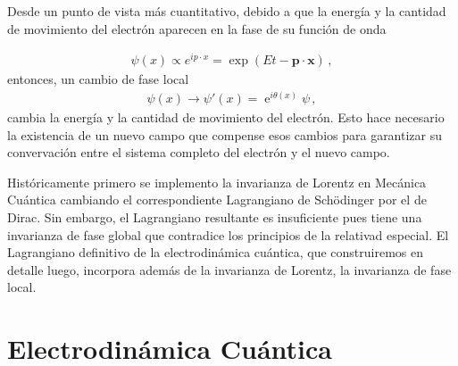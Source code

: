 Desde un punto de vista más cuantitativo, debido a que la energía y la cantidad de movimiento del electrón aparecen  en la fase de su función de onda
\begin{frame}
\begin{align}
  \psi(x)\propto e^{i p\cdot x}=\exp(Et-\mathbf{p}\cdot \mathbf{x})\,,
\end{align}
entonces, un cambio de fase local
\begin{align}
 \psi(x)\to \psi'(x)=\operatorname{e}^{{i\theta(x)}}\psi\,,
\end{align}
cambia la energía y la cantidad de movimiento del electrón. Esto hace necesario la existencia de un nuevo campo que compense esos cambios para garantizar su convervación entre el sistema completo del electrón y el nuevo campo.
\end{frame}

Históricamente primero se implemento la invarianza de Lorentz en Mecánica Cuántica cambiando el correspondiente Lagrangiano de Sch\"odinger por el de Dirac. Sin embargo, el Lagrangiano resultante es insuficiente pues tiene una invarianza de fase global que contradice los principios de la relativad especial. El Lagrangiano definitivo de la electrodinámica cuántica, que construiremos en detalle luego, incorpora además de la invarianza de Lorentz, la invarianza de fase local. 

\section{Electrodinámica Cuántica}
\label{sec:electr-cuant}


